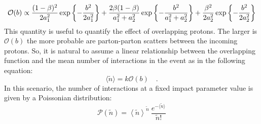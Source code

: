 \begin{equation}
\small{
	\mathcal{O}(b)\propto \frac{(1-\beta)^2}{2a_1^2}\exp\left\{-\frac{b^2}{2a_1^2}\right\}+\frac{2\beta(1-\beta)}{a_1^2+a_2^2}\exp\left\{ -\frac{b^2}{a_1^2+a_2^2} \right\}+\frac{\beta^2}{2a_2^2}\exp\left\{-\frac{b^2}{2a_2^2}\right\}
	}
\end{equation}
This quantity is useful to quantify the effect of overlapping protons.
The larger is $\mathcal{O}(b)$ the more probable are parton-parton scatters between the incoming protons. So, it is natural to assume a linear relationship between the overlapping function and the mean number of interactions in the event as in the following equation: 
\begin{equation}
\langle \widetilde{n} \rangle = k \mathcal{O}(b)\quad.
\end{equation}
In this scenario, the number of interactions at a fixed impact parameter value is given by a Poissonian distribution:
\begin{equation}
\mathcal{P}(\widetilde{n})=
	\left\langle \widetilde{n}\right\rangle ^{\widetilde{n}}\ \frac{e^{-\langle\widetilde{n}\rangle}}{\widetilde{n}!}
	\label{eq:poisson}
\end{equation} 

